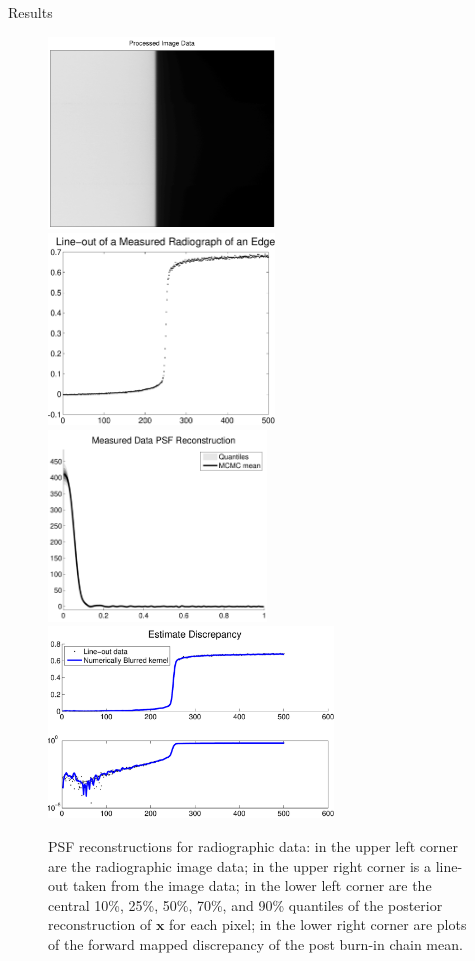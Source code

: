 \begin{chapter}{Results}
\begin{figure}[h]
  \begin{center}
  \includegraphics[height=2in]{figures/cygnusImage.pdf}\hspace{2em}\includegraphics[height=2in]{figures/cygnusLineout.pdf}\\\vspace{2em}
  \includegraphics[height=2in]{figures/cygnusPSFrecon.pdf}\hspace{2em}\includegraphics[height=2in]{figures/discrepencyPSF.pdf}
  \caption{
  PSF reconstructions for radiographic data: in the upper left corner are the radiographic image data;
  in the upper right corner is a line-out taken from the image data;
  in the lower left corner are the central 10\%, 25\%, 50\%, 70\%, and 90\% quantiles of the posterior reconstruction of $\bm x$ for each pixel;
  in the lower right corner are plots of the forward mapped discrepancy of the post burn-in chain mean.
  } \label{fig:CygnusPsfRecon}
  \end{center}
\end{figure}


\end{chapter}
